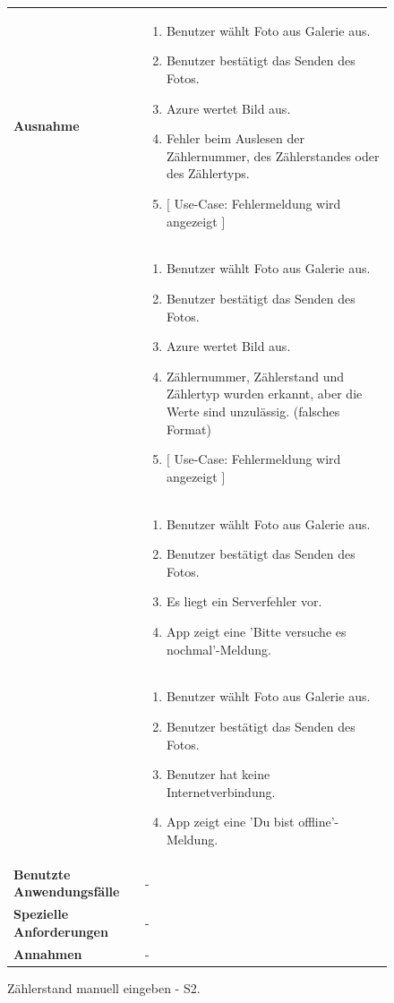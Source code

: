 \begin{figure}[H]
	\begin{tabularx}{\textwidth}{ X | X } \hline
		\textbf{Ausnahme} &
		\begin{enumerate}
			\item Benutzer wählt Foto aus Galerie aus.
			\item Benutzer bestätigt das Senden des Fotos.  
			\item Azure wertet Bild aus.
			\item Fehler beim Auslesen der Zählernummer, des Zählerstandes oder des Zählertyps. 
			\item $\lbrack$ Use-Case: Fehlermeldung wird angezeigt $\rbrack$ 
		\end{enumerate} 
		\\&
		\begin{enumerate}
			\item Benutzer wählt Foto aus Galerie aus.
			\item Benutzer bestätigt das Senden des Fotos. 
			\item Azure wertet Bild aus. 
			\item Zählernummer, Zählerstand und Zählertyp wurden erkannt, aber die Werte sind unzulässig. (falsches Format) 
			\item $\lbrack$ Use-Case: Fehlermeldung wird angezeigt $\rbrack$ 
		\end{enumerate}  
		\\&
		\begin{enumerate}
			\item Benutzer wählt Foto aus Galerie aus.
			\item Benutzer bestätigt das Senden des Fotos. 
			\item Es liegt ein Serverfehler vor. 
			\item App zeigt eine ’Bitte versuche es nochmal’-Meldung. 
		\end{enumerate}
		\\&
		\begin{enumerate}
			\item Benutzer wählt Foto aus Galerie aus.
			\item Benutzer bestätigt das Senden des Fotos.
			\item Benutzer hat keine Internetverbindung. 
			\item App zeigt eine ’Du bist offline’- Meldung.
		\end{enumerate} \\ \hline
		\textbf{Benutzte Anwendungsfälle} & - \\ \hline
		\textbf{Spezielle Anforderungen} & - \\ \hline
		\textbf{Annahmen} & - \\ \hline
	\end{tabularx}
	\caption{Zählerstand manuell eingeben - S2.}
	\label{fig:anwendungsfall-server-tabelle-xx-1}
\end{figure}

